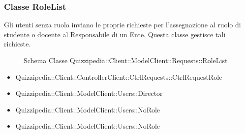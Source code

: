 \subsubsection{Classe RoleList}
Gli utenti senza ruolo inviano le proprie richieste per l'assegnazione al ruolo di studente o docente al Responsabile di un Ente. Questa classe gestisce tali richieste.
\begin{figure}[H]
\centering
\noindent{}
\caption[Schema Classe RoleList]{Schema Classe Quizzipedia::Client::ModelClient::Requests::RoleList}
\end{figure}
\begin{itemize}
\item Quizzipedia::Client::ControllerClient::CtrlRequests::CtrlRequestRole
\item Quizzipedia::Client::ModelClient::Users::Director
\item Quizzipedia::Client::ModelClient::Users::NoRole
\end{itemize}
\begin{itemize}
\item Quizzipedia::Client::ModelClient::Users::NoRole
\end{itemize}
